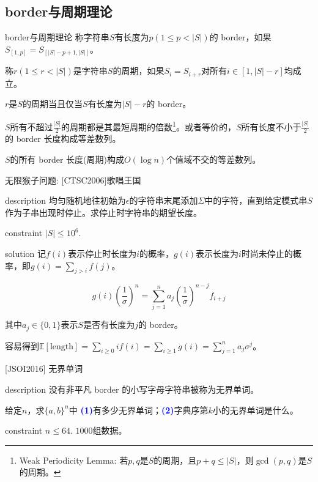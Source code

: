 \documentclass{beamer}
\theoremstyle{compact}
\def\num#1{\textnormal{\textbf{\mbox{\textcolor{blue}{(#1)}}}}}
\def\le{\leqslant}
\def\ge{\geqslant}
\begin{document}
\subsection{border与周期理论}
\begin{frame}{border与周期理论}
	称字符串$S$有长度为$p(1 \le p < |S|)$的 border，如果$S_{[1, p]} = S_{[|S| - p + 1, |S|]}$。

	称$r(1 \le r < |S|)$是字符串$S$的周期，如果$S_i = S_{i+r}$对所有$i \in [1, |S| - r]$均成立。

	\begin{theorem}
		$r$是$S$的周期当且仅当$S$有长度为$|S| - r$的 border。
	\end{theorem}\pause
	\begin{lemma}
		$S$所有不超过$\frac{|S|}{2}$的周期都是其最短周期的倍数\footnote{\tiny Weak Periodicity Lemma: 若$p, q$是$S$的周期，且$p + q \le |S|$，则$\gcd(p, q)$是$S$的周期。}。或者等价的，$S$所有长度不小于$\frac{|S|}{2}$的 border 长度构成等差数列。
	\end{lemma}
	\begin{theorem}
		$S$的所有 border 长度(周期)构成$O(\log n)$个值域不交的等差数列。
	\end{theorem}
\end{frame}
\begin{frame}{无限猴子问题: [CTSC2006]歌唱王国}
	\begin{block}{description}
		均匀随机地往初始为$\epsilon$的字符串末尾添加$\Sigma$中的字符，直到给定模式串$S$作为子串出现时停止。求停止时字符串的期望长度。
	\end{block}
	\begin{block}{constraint}
		$|S| \le 10^6.$
	\end{block}
	\pause
	\begin{block}{solution}
		记$f(i)$表示停止时长度为$i$的概率，$g(i)$表示长度为$i$时尚未停止的概率，即$g(i) = \sum_{j > i}f(j)$。

		$$g(i) \left(\frac{1}{\sigma}\right)^n = \sum_{j=1}^{n}a_j\left(\frac{1}{\sigma}\right)^{n-j}f_{i+j}$$

		其中$a_j \in \{0, 1\}$表示$S$是否有长度为$j$的 border。

		容易得到$\mathbb E[\mathrm{length}] = \sum_{i \ge 0}if(i) = \sum_{i \ge 1}g(i) = \sum_{j=1}^{n}a_j\sigma^j$。
	\end{block}
\end{frame}
\begin{frame}{[JSOI2016] 无界单词}
	\begin{block}{description}
		没有非平凡 border 的小写字母字符串被称为无界单词。

		给定$n$，求$\{a, b\}^n$中 \num{1}有多少无界单词；\num{2}字典序第$k$小的无界单词是什么。
	\end{block}
	\begin{block}{constraint}
		$n \le 64$. $1000$组数据。
	\end{block}
\end{frame}
\end{document}
